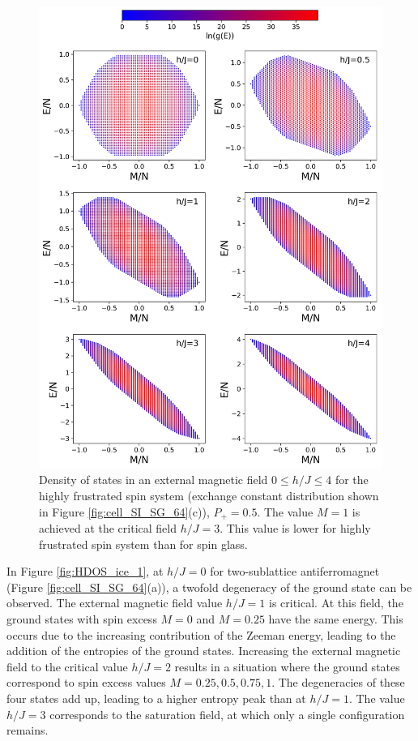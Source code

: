 \documentclass[preprint,12pt]{elsarticle}
\begin{document}
	
	\begin{figure}[H]
		\centering
		\includegraphics[width=1\linewidth]{pictures/HDOS_SI_64_J0.png}
		\caption{Density of states in an external magnetic field $0\leq h/J \leq 4$ for the highly frustrated spin system (exchange constant distribution shown in Figure \ref{fig:cell_SI_SG_64}(c)), $P_+ = 0.5$. The value $M=1$ is achieved at the critical field $h/J=3$. This value is lower for highly frustrated spin system than for spin glass.}
		\label{fig:HDOS_ice}
	\end{figure}
	
	In Figure \ref{fig:HDOS_ice_1}, at $h/J = 0$ for two-sublattice antiferromagnet (Figure \ref{fig:cell_SI_SG_64}(a)), a twofold degeneracy of the ground state can be observed. The external magnetic field value $h/J = 1$ is critical. At this field, the ground states with spin excess $M = 0$ and $M = 0.25$ have the same energy. This occurs due to the increasing contribution of the Zeeman energy, leading to the addition of the entropies of the ground states.  
	Increasing the external magnetic field to the critical value $h/J = 2$ results in a situation where the ground states correspond to spin excess values $M = 0.25, 0.5, 0.75, 1$. The degeneracies of these four states add up, leading to a higher entropy peak than at $h/J = 1$.  
	The value $h/J = 3$ corresponds to the saturation field, at which only a single configuration remains.
	
\end{document}
